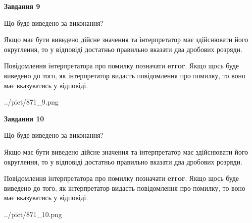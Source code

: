 \documentclass[12pt, ukrainian]{article}
\begin{document}
{\begin {Large}
{\begin {center}\textbf{Завдання 9}\end {center}}\par
Що буде виведено за виконання? \par

Якщо має бути виведено дійсне значення та інтерпретатор має здійснювати його округлення, 
то у відповіді достатньо правильно вказати два дробових розряди.

Повідомлення інтерпретатора про помилку позначати \textbf{error}.
Якщо щось буде виведено до того, як інтерпретатор видасть повідомлення про помилку, 
то воно має вказуватись у відповіді. \par

\begin{center}
	{../pict/871_9.png}
\end{center}
\newpage

{\begin {center}\textbf{Завдання 10}\end {center}}\par
Що буде виведено за виконання? \par

Якщо має бути виведено дійсне значення та інтерпретатор має здійснювати його округлення, 
то у відповіді достатньо правильно вказати два дробових розряди.

Повідомлення інтерпретатора про помилку позначати \textbf{error}.
Якщо щось буде виведено до того, як інтерпретатор видасть повідомлення про помилку, 
то воно має вказуватись у відповіді. \par

\begin{center}
	{../pict/871_10.png}
\end{center}
\newpage

\end {Large}}
\end{document}
